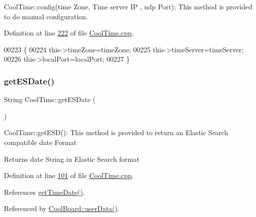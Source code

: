 Cool\+Time\+::config(time Zone, Time server I\+P , udp Port)\+: This method is provided to do manual configuration. 

Definition at line \hyperlink{_cool_time_8cpp_source_l00222}{222} of file \hyperlink{_cool_time_8cpp_source}{Cool\+Time.\+cpp}.


\begin{DoxyCode}
00223 \{
00224     this->timeZone=timeZone;
00225     this->timeServer=timeServer;
00226     this->localPort=localPort;
00227 \} 
\end{DoxyCode}
\mbox{\label{class_cool_time_ac4f32ee513c1328d984306645e8785a4}} 
\subsubsection{\texorpdfstring{get\+E\+S\+Date()}{getESDate()}}
{\footnotesize\ttfamily String Cool\+Time\+::get\+E\+S\+Date (\begin{DoxyParamCaption}{ }\end{DoxyParamCaption})}

Cool\+Time\+::get\+E\+S\+D()\+: This method is provided to return an Elastic Search compatible date Format

\begin{DoxyReturn}{Returns}
date String in Elastic Search format 
\end{DoxyReturn}


Definition at line \hyperlink{_cool_time_8cpp_source_l00101}{101} of file \hyperlink{_cool_time_8cpp_source}{Cool\+Time.\+cpp}.



References \hyperlink{_cool_time_8cpp_source_l00085}{get\+Time\+Date()}.



Referenced by \hyperlink{_cool_board_8cpp_source_l00548}{Cool\+Board\+::user\+Data()}.



